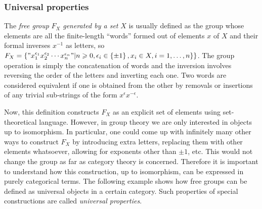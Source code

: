 \documentclass[english,letterpaper]{article}%
\numberwithin{equation}{section}
\numberwithin{figure}{section}
\numberwithin{table}{section}
\theoremstyle{definition}
\theoremstyle{definition}
\theoremstyle{definition}
\theoremstyle{plain}
\theoremstyle{plain}
\theoremstyle{plain}
\theoremstyle{plain}
\theoremstyle{remark}
\theoremstyle{remark}
\renewcommand{\geq}{\geqslant}
\begin{document}
\subsubsection{Universal properties}
\begin{defn}
The \emph{free group} $F_{X}$ \emph{generated by a set} $X$
is usually defined as the group whose elements are all the finite-length
``words'' formed out of elements $x$ of $X$ and their formal inverses
$x^{-1}$ as letters, so $F_{X}=\left\{ "x_{1}^{\epsilon_{1}}x_{2}^{\epsilon_{2}}\cdots x_{n}^{\epsilon_{n}}"|n\geq0,\epsilon_{i}\in\left\{ \pm1\right\} ,x_{i}\in X,i=1,\ldots,n\}\right\} $.
The group operation is simply the concatenation of words and the inversion
involves reversing the order of the letters and inverting each one. Two words are considered equivalent if one is obtained from the other by removals or insertions of any trivial sub-strings of the form $x^{\epsilon}x^{-\epsilon}$.
\end{defn}
Now, this definition constructs $F_{X}$ as an explicit set of elements
using set-theoretical language. However, in group theory we are only
interested in objects up to isomorphism. In particular, one could
come up with infinitely many other ways to construct $F_{X}$ by introducing
extra letters, replacing them with other elements whatsoever, allowing for exponents other than $\pm 1$, etc. This
would not change the group as far as category theory is concerned.
Therefore it is important to understand how this construction, up
to isomorphism, can be expressed in purely categorical terms. The
following example shows how free groups can be defined as universal
objects in a certain category. Such properties of special constructions
are called \emph{universal properties}.
\end{document}
